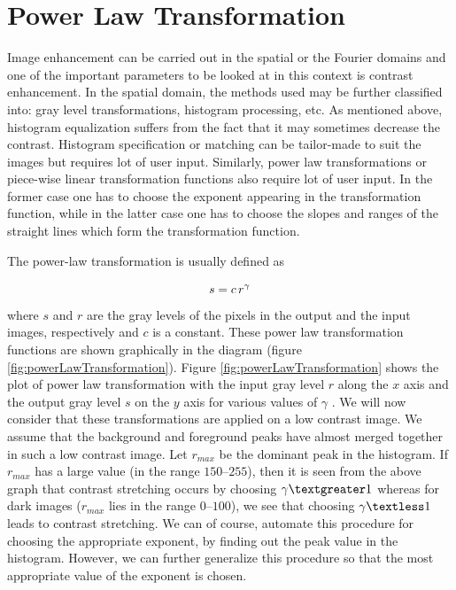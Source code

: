 \section{Power Law Transformation}
Image enhancement can be carried out in the spatial or the Fourier domains and one of the important
parameters to be looked at in this context is contrast enhancement. In the spatial domain,
the methods used may be further classified into: gray level transformations, histogram processing,
etc. As mentioned above, histogram equalization suffers from the fact that it may sometimes
decrease the contrast. Histogram specification or matching can be tailor-made to suit the images
but requires lot of user input. Similarly, power law transformations or piece-wise linear transformation
functions also require lot of user input. In the former case one has to choose the exponent
appearing in the transformation function, while in the latter case one has to choose the slopes
and ranges of the straight lines which form the transformation function.

The power-law transformation is usually defined as

\begin{equation}
	s=c \thinspace r^\gamma
\end{equation}
where $s$ and $r$ are the gray levels of the pixels in the output and the input images, respectively and
$c$ is a constant. These power law transformation functions are shown graphically in the diagram
(figure \ref{fig:powerLawTransformation}).
Figure \ref{fig:powerLawTransformation} shows the plot of power law transformation with the input gray level $r$ along the $x$ axis and the output gray level $s$ on the $y$ axis for various values of $\gamma$ .
We will now consider that these transformations are applied on a low contrast image. We
assume that the background and foreground peaks have almost merged together in such a low
contrast image. Let $r_{max}$ be the dominant peak in the histogram. If $r_{max}$ has a large value (in the
range $150\textrm{--}255$), then it is seen from the above graph that contrast stretching occurs by choosing
$\gamma \textgreater 1$ whereas for dark images ($r_{max}$ lies in the range $0\textrm{--}100$), we see that choosing $\gamma \textless 1$ leads
to contrast stretching. We can of course, automate this procedure for choosing the appropriate
exponent, by finding out the peak value in the histogram. However, we can further generalize
this procedure so that the most appropriate value of the exponent is chosen.

